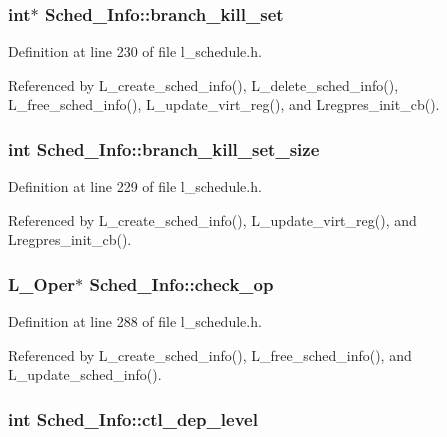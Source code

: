 \subsubsection{\setlength{\rightskip}{0pt plus 5cm}int$\ast$ \bf{Sched\_\-Info::branch\_\-kill\_\-set}}\label{structSched__Info_8783c93fe484760291bd49a4d175774a}




Definition at line 230 of file l\_\-schedule.h.

Referenced by L\_\-create\_\-sched\_\-info(), L\_\-delete\_\-sched\_\-info(), L\_\-free\_\-sched\_\-info(), L\_\-update\_\-virt\_\-reg(), and Lregpres\_\-init\_\-cb().
\subsubsection{\setlength{\rightskip}{0pt plus 5cm}int \bf{Sched\_\-Info::branch\_\-kill\_\-set\_\-size}}\label{structSched__Info_c02d368ce947d325a788c0b97e208415}




Definition at line 229 of file l\_\-schedule.h.

Referenced by L\_\-create\_\-sched\_\-info(), L\_\-update\_\-virt\_\-reg(), and Lregpres\_\-init\_\-cb().
\subsubsection{\setlength{\rightskip}{0pt plus 5cm}L\_\-Oper$\ast$ \bf{Sched\_\-Info::check\_\-op}}\label{structSched__Info_bdd5d9297515e751ed153f5c6bdb42e1}




Definition at line 288 of file l\_\-schedule.h.

Referenced by L\_\-create\_\-sched\_\-info(), L\_\-free\_\-sched\_\-info(), and L\_\-update\_\-sched\_\-info().
\subsubsection{\setlength{\rightskip}{0pt plus 5cm}int \bf{Sched\_\-Info::ctl\_\-dep\_\-level}}\label{structSched__Info_5d02f68c7bfdacff0b2378e37ff66f48}





